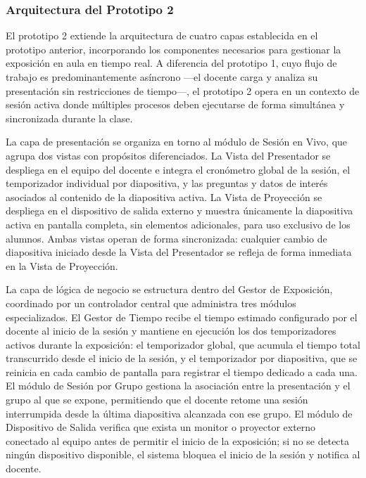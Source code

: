 \documentclass[11pt]{article}
\newif\ifshowttiimarks
\newcommand{\ttiiTOC}[1]{%
  \ifshowttiimarks
    \texorpdfstring{\textcolor{ttiipurple}{\textbf{#1}}}{#1}%
  \else
    #1%
  \fi
}
\begin{document}
\subsubsection*{Arquitectura del Prototipo 2}
\addcontentsline{toc}{subsubsection}{\protect\ttiiTOC{Arquitectura del Prototipo 2}}

El prototipo 2 extiende la arquitectura de cuatro capas establecida en el prototipo anterior, incorporando los componentes necesarios para gestionar la exposición en aula en tiempo real. A diferencia del prototipo 1, cuyo flujo de trabajo es predominantemente asíncrono —el docente carga y analiza su presentación sin restricciones de tiempo—, el prototipo 2 opera en un contexto de sesión activa donde múltiples procesos deben ejecutarse de forma simultánea y sincronizada durante la clase.

La capa de presentación se organiza en torno al módulo de Sesión en Vivo, que agrupa dos vistas con propósitos diferenciados. La Vista del Presentador se despliega en el equipo del docente e integra el cronómetro global de la sesión, el temporizador individual por diapositiva, y las preguntas y datos de interés asociados al contenido de la diapositiva activa. La Vista de Proyección se despliega en el dispositivo de salida externo y muestra únicamente la diapositiva activa en pantalla completa, sin elementos adicionales, para uso exclusivo de los alumnos. Ambas vistas operan de forma sincronizada: cualquier cambio de diapositiva iniciado desde la Vista del Presentador se refleja de forma inmediata en la Vista de Proyección.

La capa de lógica de negocio se estructura dentro del Gestor de Exposición, coordinado por un controlador central que administra tres módulos especializados. El Gestor de Tiempo recibe el tiempo estimado configurado por el docente al inicio de la sesión y mantiene en ejecución los dos temporizadores activos durante la exposición: el temporizador global, que acumula el tiempo total transcurrido desde el inicio de la sesión, y el temporizador por diapositiva, que se reinicia en cada cambio de pantalla para registrar el tiempo dedicado a cada una. El módulo de Sesión por Grupo gestiona la asociación entre la presentación y el grupo al que se expone, permitiendo que el docente retome una sesión interrumpida desde la última diapositiva alcanzada con ese grupo. El módulo de Dispositivo de Salida verifica que exista un monitor o proyector externo conectado al equipo antes de permitir el inicio de la exposición; si no se detecta ningún dispositivo disponible, el sistema bloquea el inicio de la sesión y notifica al docente.
\end{document}
